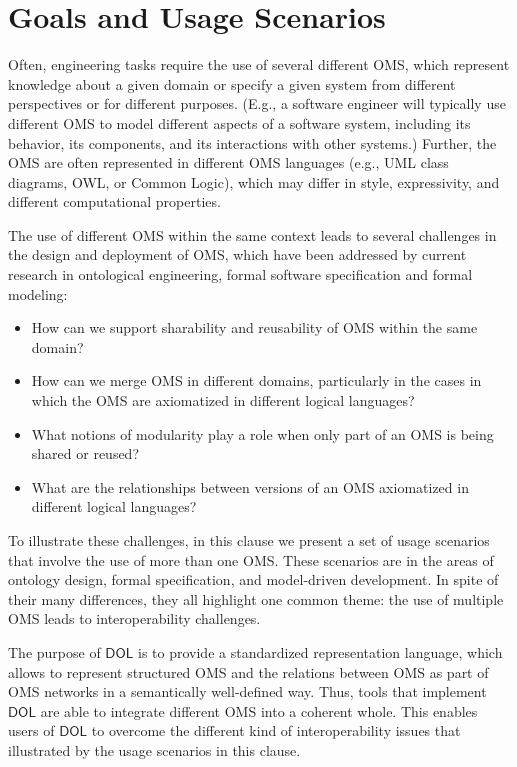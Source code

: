 \documentclass[10pt,fleqn,%
\ifpretendfinal
final%
\else
draft%
\fi,
]{scrreprt}
\newcommand*{\DOL}{\ensuremath{\mathsf{DOL}}\xspace}
\begin{document}

\chapter{Goals and Usage Scenarios} \label{c:goal}


Often, engineering tasks require the use of several different OMS, which represent knowledge about 
a given domain or specify a given system from different perspectives or for different purposes.
(E.g., a software engineer will typically use different OMS to model different aspects of a software
 system,  including its behavior, its components, and its interactions with other systems.)  Further, the OMS are often represented in different OMS languages (e.g., UML class diagrams, OWL, or Common Logic), which may differ in style, expressivity, and different computational properties. 

The use of different OMS within the same context leads to  several 
challenges in the design and deployment of OMS, which have been addressed by current research in 
ontological engineering, formal software specification and formal modeling:
\begin{itemize}
\item How can we support sharability and reusability of OMS within the same domain?
\item How can we merge OMS in different domains, particularly in the cases 
in which the OMS are axiomatized in different logical languages?
\item What notions of modularity play a role when only part of an OMS is being shared or reused?
\item What are the relationships between versions of an OMS axiomatized in different logical languages?
\end{itemize}


To illustrate these challenges, in this clause we present a set of usage scenarios that involve the use of more than one OMS. These scenarios are in the areas of ontology design, formal specification, and model-driven development. In spite of their many differences, they  all highlight one common theme:  
 the use of multiple OMS leads to interoperability challenges. 


The purpose of \DOL is to provide  a
standardized representation language, which allows to represent structured OMS and the relations 
between OMS as part of OMS networks in a semantically well-defined way. Thus, tools that implement \DOL are able to integrate different OMS into a coherent whole.  This enables users of \DOL to overcome the different kind of interoperability issues that illustrated by the usage scenarios in this clause.  
\end{document}
